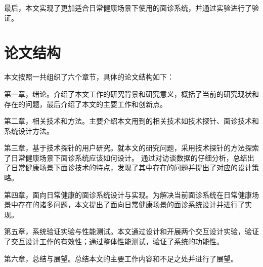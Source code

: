 最后，本文实现了更加适合日常健康场景下使用的面诊系统，并通过实验进行了验证。




\section{论文结构}
本文按照一共组织了六个章节，具体的论文结构如下：

第一章，绪论。介绍了本文工作的研究背景和研究意义，概括了当前的研究现状和存在的问题，最后介绍了本文的主要工作和创新点。

第二章，相关技术和方法。主要介绍本文用到的相关技术如技术探针、面诊技术和系统设计方法。

第三章，基于技术探针的用户研究。就本文的研究问题，采用技术探针的方法探索了日常健康场景下面诊系统应该如何设计。
通过对访谈数据的仔细分析，总结出了日常健康场景下面诊技术的特点，发现了其中存在的问题并提出了对应的设计策略。

第四章，面向日常健康的面诊系统设计与实现。为解决当前面诊系统在日常健康场景中存在的诸多问题，本文提出了面向日常健康场景的面诊系统设计并进行了实现。

第五章，系统验证实验与性能测试。本文通过设计和开展两个交互设计实验，验证了交互设计工作的有效性；通过整体性能测试，验证了系统的功能性。

第六章，总结与展望。总结本文的主要工作内容和不足之处并进行了展望。